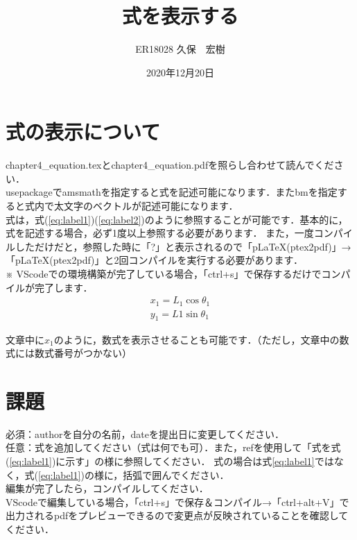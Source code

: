 \documentclass[a4paper,10pt]{jsarticle}
\title{式を表示する}%
\author{ER18028 久保　宏樹}%
\date{2020年12月20日}%
\begin{document}
\maketitle%
\section{式の表示について}
chapter4\_equation.texとchapter4\_equation.pdfを照らし合わせて読んでください．\\

usepackageでamsmathを指定すると式を記述可能になります．またbmを指定すると式内で太文字のベクトルが記述可能になります．\\

式は，式(\ref{eq:label1})(\ref{eq:label2})のように参照することが可能です．基本的に，式を記述する場合，必ず1度以上参照する必要があります．
また，一度コンパイルしただけだと，参照した時に「?」と表示されるので「pLaTeX(ptex2pdf)」→「pLaTeX(ptex2pdf)」と2回コンパイルを実行する必要があります．\\
※ VScodeでの環境構築が完了している場合，「ctrl+s」で保存するだけでコンパイルが完了します．
\begin{gather}
    x_{1} = L_{1} \cos \theta_{1} 
    \label{eq:label1} \\
    y_{1} = L{1}\sin \theta_{1} 
    \label{eq:label2}
\end{gather}

文章中に$x_1$のように，数式を表示させることも可能です．（ただし，文章中の数式には数式番号がつかない）
\section{課題}
\noindent 必須：authorを自分の名前，dateを提出日に変更してください．\\
任意：式を追加してください（式は何でも可）．また，refを使用して「式を式(\ref{eq:label1})に示す」の様に参照してください．
式の場合は式\ref{eq:label1}ではなく，式(\ref{eq:label1})の様に，括弧で囲んでください．\\

\noindent 編集が完了したら，コンパイルしてください．\\
VScodeで編集している場合，「ctrl+s」で保存＆コンパイル→「ctrl+alt+V」で出力されるpdfをプレビューできるので変更点が反映されていることを確認してください．
\end{document}
